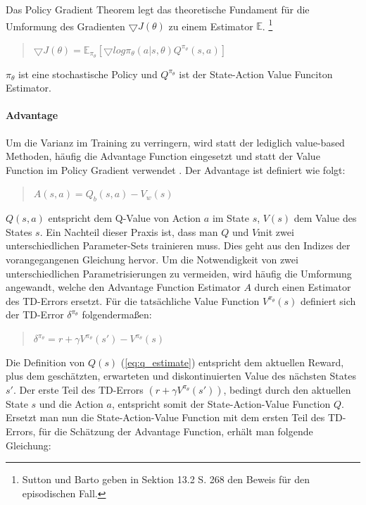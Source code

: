 Das Policy Gradient Theorem legt das theoretische Fundament für die Umformung des Gradienten $ \bigtriangledown J(\theta) $ zu einem Estimator $\mathbb{E}$. \footnote{ Sutton und Barto geben in Sektion 13.2 \cite{sutton2011reinforcement}{S. 268} den Beweis für den episodischen Fall. }

\begin{quotation}
\centering
   \( \bigtriangledown J(\theta)  =  \mathbb{E}_{\pi_{\theta}} [ \bigtriangledown log \pi_{\theta}(a | s, \theta) Q^{\pi_{\theta}}(s,a) ] \) 
\end{quotation}

$ \pi_{\theta} $ ist eine stochastische Policy und $ Q^{\pi_{\theta}} $ ist der State-Action Value Funciton Estimator.


\paragraph{Advantage}\label{subsubsec_RL_advantage}
Um die Varianz im Training zu verringern, wird statt der lediglich value-based Methoden, häufig die Advantage Function eingesetzt und statt der Value Function im Policy Gradient verwendet \cite{schulman2017proximal}. 
Der Advantage ist definiert wie folgt: 

\begin{quotation}
\label{Advantage-Estimate}
\centering
   \(  A(s,a) = Q_b(s,a) - V_w(s)  \)
\end{quotation}

$ Q(s,a) $ entspricht dem Q-Value von Action $ a $ im State $s$, $ V(s) $ dem Value des States $ s $.  Ein Nachteil dieser Praxis ist, dass man $ Q $ und $ V $mit zwei unterschiedlichen Parameter-Sets trainieren muss. Dies geht aus den Indizes der vorangegangenen Gleichung hervor. Um die Notwendigkeit von zwei unterschiedlichen Parametrisierungen zu vermeiden, wird häufig die Umformung angewandt, welche den Advantage Function Estimator $ A $ durch einen Estimator des TD-Errors ersetzt. Für die tatsächliche Value Function $ V^{\pi_{\theta}}(s) $ definiert sich der TD-Error $ \delta^{\pi_{\theta}} $ folgendermaßen: 

\begin{quotation}
\label{TD-Error}
\centering
   \(  \delta^{\pi_{\theta}} = r + \gamma V^{\pi_{\theta}}(s') - V^{\pi_{\theta}}(s)  \)
\end{quotation}

Die Definition von $ Q(s) $ (\ref{eq:q_estimate}) entspricht dem aktuellen Reward, plus dem geschätzten, erwarteten und diskontinuierten Value des nächsten States $ s' $.  Der erste Teil des TD-Errors $ ( r + \gamma V^{\pi_{\theta}}(s') ) $, bedingt durch den aktuellen State $s$ und die Action $a$, entspricht somit der State-Action-Value Function $Q$. 
Ersetzt man nun die State-Action-Value Function mit dem ersten Teil des TD-Errors, für die Schätzung der Advantage Function, erhält man folgende Gleichung: 

